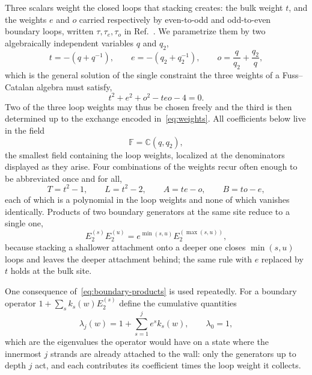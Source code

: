 \documentclass[
  aps,pre,
  reprint,
  superscriptaddress,
  amsmath,amssymb,
  floatfix
]{revtex4-2}
\theoremstyle{plain}
\theoremstyle{definition}
\theoremstyle{remark}
\newcommand{\Fld}{\mathbb{F}}
\begin{document}
Three scalars weight the closed loops that stacking creates: the bulk weight
$t$, and the weights $e$ and $o$ carried respectively by even-to-odd and
odd-to-even boundary loops, written $\tau,\tau_e,\tau_o$ in
Ref.~\cite{shigechi2025fuss}. We parametrize them by two algebraically
independent variables $q$ and $q_2$,
\begin{equation}
  t=-(q+q^{-1}),\qquad e=-(q_2+q_2^{-1}),\qquad o=\frac{q}{q_2}+\frac{q_2}{q},
  \label{eq:weights}
\end{equation}
which is the general solution of the single constraint the three weights of a
Fuss--Catalan algebra must satisfy,
\begin{equation}
  t^2+e^2+o^2-teo-4=0 .
  \label{eq:fc-constraint}
\end{equation}
Two of the three loop weights may thus be chosen freely and the third is then
determined up to the exchange encoded in~\eqref{eq:weights}. All coefficients
below live in the field
\begin{equation}
  \Fld=\mathbb{C}(q,q_2),
  \label{eq:field}
\end{equation}
the smallest field containing the loop weights, localized at the denominators
displayed as they arise. Four combinations of the weights recur often enough to
be abbreviated once and for all,
\begin{equation}
  T=t^2-1,\qquad L=t^2-2,\qquad A=te-o,\qquad B=to-e ,
  \label{eq:abbrev}
\end{equation}
each of which is a polynomial in the loop weights and none of which vanishes
identically. Products of two boundary generators at the same site reduce to a
single one,
\begin{equation}
  E_2^{(s)}E_2^{(u)}=e^{\min(s,u)}E_2^{(\max(s,u))},
  \label{eq:boundary-products}
\end{equation}
because stacking a shallower attachment onto a deeper one closes
$\min(s,u)$ loops and leaves the deeper attachment behind; the same rule with
$e$ replaced by $t$ holds at the bulk site.

One consequence of~\eqref{eq:boundary-products} is used repeatedly. For a
boundary operator $1+\sum_s k_s(w)E_2^{(s)}$ define the cumulative quantities
\begin{equation}
  \lambda_j(w)=1+\sum_{s=1}^{j}e^{s}k_s(w),\qquad \lambda_0=1 ,
  \label{eq:cumulative}
\end{equation}
which are the eigenvalues the operator would have on a state where the
innermost $j$ strands are already attached to the wall: only the generators up
to depth $j$ act, and each contributes its coefficient times the loop weight it
collects.
\end{document}
